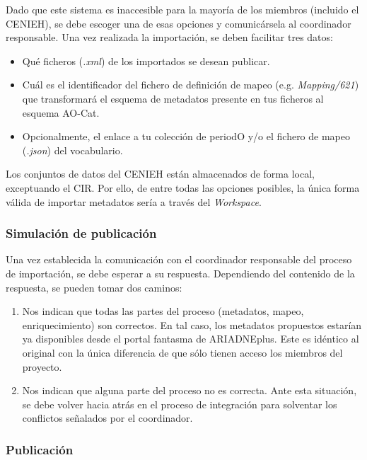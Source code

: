 \documentclass[
]{article}
\providecommand{\tightlist}{%
  \setlength{\itemsep}{0pt}\setlength{\parskip}{0pt}}
\begin{document}
Dado que este sistema es inaccesible para la mayoría de los miembros
(incluido el CENIEH), se debe escoger una de esas opciones y
comunicársela al coordinador responsable. Una vez realizada la
importación, se deben facilitar tres datos:

\begin{itemize}
\tightlist
\item
  Qué ficheros (\emph{.xml}) de los importados se desean publicar.
\item
  Cuál es el identificador del fichero de definición de mapeo (e.g.
  \emph{Mapping/621}) que transformará el esquema de metadatos presente
  en tus ficheros al esquema AO-Cat.
\item
  Opcionalmente, el enlace a tu colección de periodO y/o el fichero de
  mapeo (\emph{.json}) del vocabulario.
\end{itemize}

Los conjuntos de datos del CENIEH están almacenados de forma local,
exceptuando el CIR. Por ello, de entre todas las opciones posibles, la
única forma válida de importar metadatos sería a través del
\emph{Workspace}.

\hypertarget{simulaciuxf3n-de-publicaciuxf3n}{%
\subsubsection{Simulación de
publicación}\label{simulaciuxf3n-de-publicaciuxf3n}}

Una vez establecida la comunicación con el coordinador responsable del
proceso de importación, se debe esperar a su respuesta. Dependiendo del
contenido de la respuesta, se pueden tomar dos caminos:

\begin{enumerate}
\def\labelenumi{\arabic{enumi}.}
\tightlist
\item
  Nos indican que todas las partes del proceso (metadatos, mapeo,
  enriquecimiento) son correctos. En tal caso, los metadatos propuestos
  estarían ya disponibles desde el portal fantasma de ARIADNEplus. Este
  es idéntico al original con la única diferencia de que sólo tienen
  acceso los miembros del proyecto.
\item
  Nos indican que alguna parte del proceso no es correcta. Ante esta
  situación, se debe volver hacia atrás en el proceso de integración
  para solventar los conflictos señalados por el coordinador.
\end{enumerate}

\hypertarget{publicaciuxf3n}{%
\subsubsection{Publicación}\label{publicaciuxf3n}}
\end{document}

